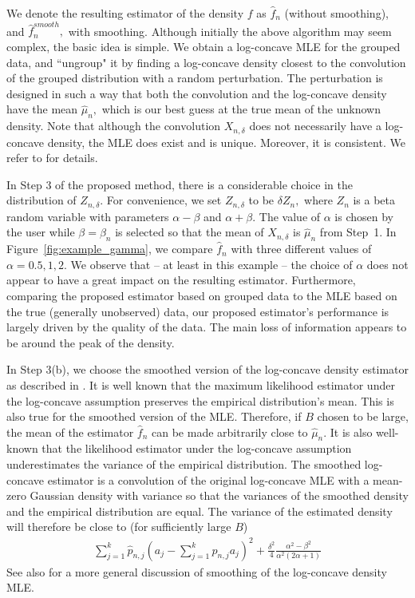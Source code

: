 \documentclass[12pt]{article} %
\begin{document}
We denote the resulting estimator of the density $f$ as $\widehat f_{n}$ (without smoothing), and $\widehat f_n^{smooth},$ with smoothing.  Although initially the above algorithm may seem complex, the basic idea is simple.  We obtain a log-concave MLE for the grouped data, and ``ungroup" it by finding a log-concave density closest to the convolution of the grouped distribution with a random perturbation.   The perturbation is designed in such a way that both the convolution and the log-concave density have the mean $\widehat \mu_n,$ which is our best guess at the true mean of the unknown density.   Note that although the convolution $X_{n,\delta}$ does not necessarily have a log-concave density, the MLE does exist and is unique.   Moreover, it is consistent.  We refer to \citet{Cule08} for details.  

In Step 3 of the proposed method, there is a considerable choice in the distribution of $Z_{n,\delta}$.   For convenience, we set $Z_{n,\delta}$ to be $\delta Z_n,$ where $Z_n$ is a beta random variable with parameters $\alpha-\beta$ and $\alpha+\beta.$   The value of $\alpha$ is chosen by the user while $\beta=\beta_n$ is selected so that the mean of $X_{n,\delta}$ is $\widehat \mu_n$ from Step~1.  In Figure~\ref{fig:example_gamma}, we compare $\widehat f_n$ with three different values of $\alpha= 0.5, 1, 2.$  We observe that -- at least in this example -- the choice of $\alpha$ does not appear to have a great impact on the resulting estimator.   Furthermore, comparing the proposed estimator based on grouped data to the MLE based on the true (generally unobserved) data, our proposed estimator's performance is largely driven by the quality of the data.  The main loss of information appears to be around the peak of the density. 




In Step 3(b), we choose the smoothed version of the log-concave density estimator as described in \citet{dumbgen2009logcondens}.   It is well known that the maximum likelihood estimator under the log-concave assumption preserves the empirical distribution's mean. This is also true for the smoothed version of the MLE.  Therefore, if $B$ chosen to be large, the mean of the estimator $\widehat f_n$ can be made arbitrarily close to $\widehat \mu_n.$  It is also well-known that the likelihood estimator under the log-concave assumption underestimates the variance of the empirical distribution.  The smoothed log-concave estimator is a convolution of the original log-concave MLE with a mean-zero Gaussian density with variance so that the variances of the smoothed density and the empirical distribution are equal.  The variance of the estimated density will therefore be close to (for sufficiently large $B$) \begin{eqnarray*}
\sum_{j=1}^k \widehat p_{n,j} \left(a_j -\sum_{j=1}^k p_{n,j} a_j \right)^2 + \frac{\delta^2}{4} \frac{\alpha^2-\beta^2}{\alpha^2 (2\alpha+1)}
\end{eqnarray*}
See also \citet{chenSam2013} for a more general discussion of smoothing of the log-concave density MLE. 
\end{document}

